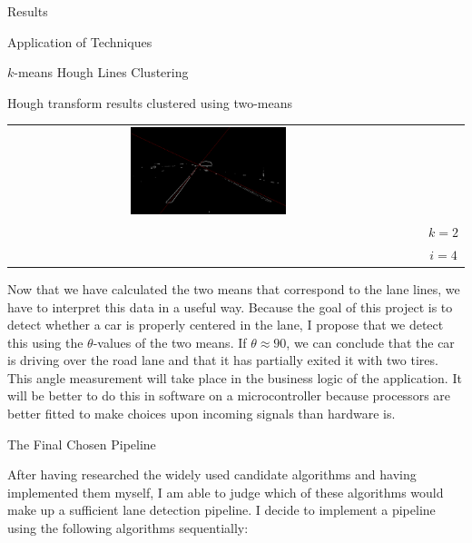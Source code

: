 \documentclass{matthijs}
\begin{document}
\begin{hoofdstuk}{Results}
\begin{paragraaf}{Application of Techniques}
\begin{subparagraaf}{$k$-means Hough Lines Clustering}
\begin{figuur}{Hough transform results clustered using two-means}
\begin{tabular}{ccc}
						\includegraphics[width=0.4\textwidth]{0a0a0b1a-7c39d841.kmeans.out.png} \\

						&& $ k = 2 $ \\
						&& $ i = 4 $
					\end{tabular}

				\end{figuur}

				Now that we have calculated the two means that correspond to the lane lines, we have to interpret this data in a useful way.
				Because the goal of this project is to detect whether a car is properly centered in the lane, I propose that we detect this using the $\theta$-values of the two means.
				If $\theta \approx 90$, we can conclude that the car is driving over the road lane and that it has partially exited it with two tires.
				This angle measurement will take place in the business logic of the application.
				It will be better to do this in software on a microcontroller because processors are better fitted to make choices upon incoming signals than hardware is.

			\end{subparagraaf}

		\end{paragraaf}

		\begin{paragraaf}{The Final Chosen Pipeline}

			After having researched the widely used candidate algorithms and having implemented them myself, I am able to judge which of these algorithms would make up a sufficient lane detection pipeline.
			I decide to implement a pipeline using the following algorithms sequentially:

			\begin{enumerate}


\end{enumerate}
\end{paragraaf}
\end{hoofdstuk}
\end{document}
